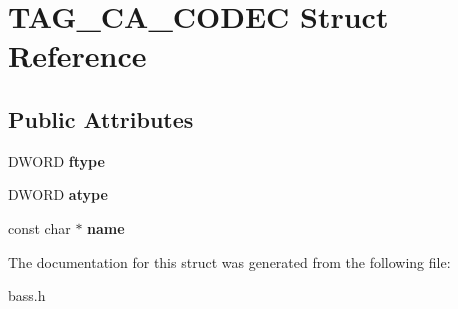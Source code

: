 \hypertarget{structTAG__CA__CODEC}{}\section{T\+A\+G\+\_\+\+C\+A\+\_\+\+C\+O\+D\+E\+C Struct Reference}
\label{structTAG__CA__CODEC}
\subsection*{Public Attributes}
\begin{DoxyCompactItemize}
\item 
\hypertarget{structTAG__CA__CODEC_af43a0d3c8d295bc3a37ae9245a47619b}{}D\+W\+O\+R\+D {\bfseries ftype}\label{structTAG__CA__CODEC_af43a0d3c8d295bc3a37ae9245a47619b}

\item 
\hypertarget{structTAG__CA__CODEC_a9f3c5b7726d72f1174290dfca6793bc1}{}D\+W\+O\+R\+D {\bfseries atype}\label{structTAG__CA__CODEC_a9f3c5b7726d72f1174290dfca6793bc1}

\item 
\hypertarget{structTAG__CA__CODEC_a513a8849b3b4850ff4f1b0e14fe2146c}{}const char $\ast$ {\bfseries name}\label{structTAG__CA__CODEC_a513a8849b3b4850ff4f1b0e14fe2146c}

\end{DoxyCompactItemize}


The documentation for this struct was generated from the following file\+:\begin{DoxyCompactItemize}
\item 
bass.\+h\end{DoxyCompactItemize}
